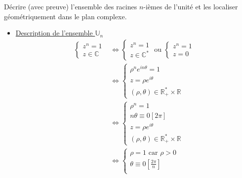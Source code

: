 \documentclass{article}
\begin{document}
\begin{question_kholle}{Décrire (avec preuve) l'ensemble des racines $n$-ièmes de l'unité et les localiser géométriquement dans le plan complexe.}
    \begin{itemize}
        \item \underline{Description de l'ensemble $\mathbb U _n$}
        \begin{align*}
            \left\{ \begin{array}{ll}
                z^{n}=1 \\
                z \in \mathbb{C} 
            \end{array}\right.
            &\iff 
            \left\{ \begin{array}{ll}
                z^{n} = 1 \\
                z \in \mathbb{C}^{*}
            \end{array}\right. \text{ ou } 
            \left\{ \begin{array}{ll}
                z^{n} = 1 \\
                z = 0 
            \end{array}\right. \\
            & \iff 
            \left\{ \begin{array}{ll}
                \rho^{n}e^{in \theta}  = 1 \\
                z = \rho e^{i \theta} \\
                (\rho, \theta) \in \mathbb{R}_{+}^{*}\times \mathbb{R}
            \end{array}\right.
            \\ & \iff 
            \left\{ \begin{array}{ll} 
                \rho^{n} = 1 \\
                n \theta \equiv 0 [2 \pi]\\
                z = \rho e^{i \theta} \\
                (\rho, \theta) \in \mathbb{R}_{+}^{*}\times \mathbb{R}
            \end{array}\right. 
            \\ & \iff 
            \left\{ \begin{array}{ll} 
                \rho = 1 \text{ car } \rho > 0 \\
                \theta \equiv 0 \left[ \frac{2\pi}{n} \right]\\

\end{array}
\end{align*}
\end{itemize}
\end{question_kholle}
\end{document}
